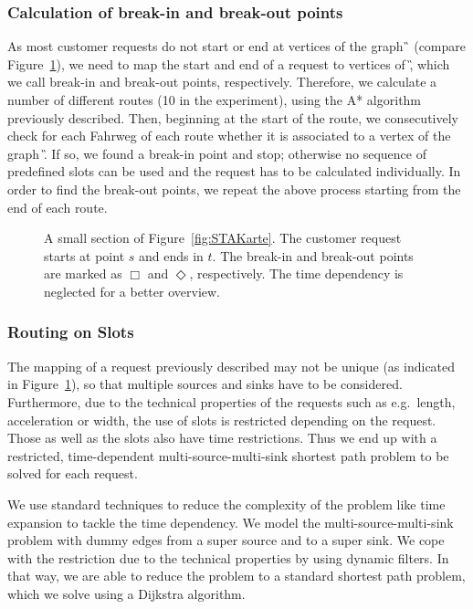 \subsubsection{Calculation of break-in and break-out points}
%
As most customer requests do not start or end at vertices of the graph \G\, (compare Figure~\ref{fig:E-A-Pkte}), we need to map the start and end of a request to vertices of \G, which we call break-in and break-out points, respectively. Therefore, we calculate a number of different routes (10 in the experiment), using the A* algorithm previously described. Then, beginning at the start of the route, we consecutively check for each Fahrweg of each route whether it is associated to a vertex of the graph \G. If so, we found a break-in point and stop; otherwise no sequence of predefined slots can be used and the request has to be calculated individually. In order to find the break-out points, we repeat the above process starting from the end of each route.
%
\begin{figure}[tb]
	\centering
	\caption{A small section of Figure~\ref{fig:STAKarte}. The customer request starts at point $s$ and ends in $t$. The break-in and break-out points are marked as $\Box$ and $\Diamond$, respectively. The time dependency is neglected for a better overview.}
	\label{fig:E-A-Pkte}
\end{figure}

\subsubsection{Routing on Slots}
The mapping of a request previously described may not be unique (as indicated in Figure~\ref{fig:E-A-Pkte}), so that multiple sources and sinks have to be considered. Furthermore, due to the technical properties of the requests such as e.g.\ length, acceleration or width, the use of slots is restricted depending on the request. Those as well as the slots also have time restrictions. Thus we end up with a restricted, time-dependent multi-source-multi-sink shortest path problem to be solved for each request.

We use standard techniques to reduce the complexity of the problem like time expansion to tackle the time dependency. We model the multi-source-multi-sink problem with dummy edges from a super source and to a super sink. We cope with the restriction due to the technical properties by using dynamic filters. In that way, we are able to reduce the problem to a standard shortest path problem, which we solve using a Dijkstra algorithm.

